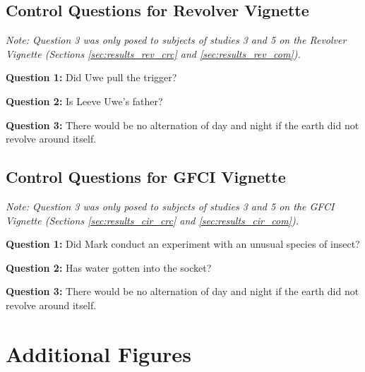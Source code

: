 \documentclass[egregdoesnotlikesansseriftitles,12pt]{scrartcl}
\begin{document}
\subsection{Control Questions for Revolver Vignette}\label{app:main_revolver_control}
\noindent\textit{Note: Question 3 was only posed to subjects of studies 3 and 5 on the Revolver Vignette (Sections \ref{sec:results_rev_crc} and \ref{sec:results_rev_com}).}

\vspace{1ex}
\noindent\textbf{Question 1:} Did Uwe pull the trigger?%

\vspace{1ex}
\noindent\textbf{Question 2:} Is Leeve Uwe's father?%

\vspace{1ex}
\noindent\textbf{Question 3:} There would be no alternation of day and night if the earth did not revolve around itself.%

\subsection{Control Questions for GFCI Vignette}\label{app:main_circuit_control}
\noindent\textit{Note: Question 3 was only posed to subjects of studies 3 and 5 on the GFCI Vignette (Sections \ref{sec:results_cir_crc} and \ref{sec:results_cir_com}).}

\vspace{1ex}
\noindent\textbf{Question 1:} Did Mark conduct an experiment with an unusual species of insect?%

\vspace{1ex}
\noindent\textbf{Question 2:} Has water gotten into the socket?%

\vspace{1ex}
\noindent\textbf{Question 3:} There would be no alternation of day and night if the earth did not revolve around itself.%

\clearpage
\section{Additional Figures}\label{app:additional_figures}
\end{document}
